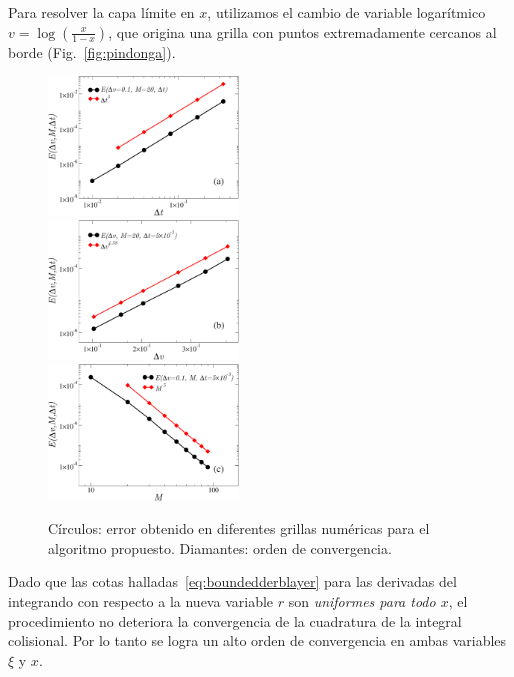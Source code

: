 Para resolver la capa límite en $x$, utilizamos 
el cambio de variable logarítmico $v=\log(\frac{x}{1-x})$, 
que origina una grilla con puntos extremadamente cercanos al borde (Fig.~\ref{fig:pindonga}). 
\begin{figure}
  \includegraphics[width=0.45\textwidth]{figuras/errdt.pdf}\\
  \vspace{2mm}
  \includegraphics[width=0.45\textwidth]{figuras/errdx.pdf}\\
  \vspace{2mm}
  \includegraphics[width=0.45\textwidth]{figuras/xiconv.pdf}
  \caption{Círculos: error obtenido en diferentes grillas numéricas para el algoritmo 
  propuesto. Diamantes: orden de convergencia.}
 \label{fig:conv}
\end{figure}
Dado que las cotas halladas~\eqref{eq:boundedderblayer} para las derivadas del 
integrando con respecto a la nueva variable $r$ son {\em uniformes para todo $x$},  
el procedimiento no deteriora la convergencia de la 
cuadratura de la integral colisional.  Por lo tanto 
se logra un alto orden de convergencia en ambas variables $\xi$ y $x$.


